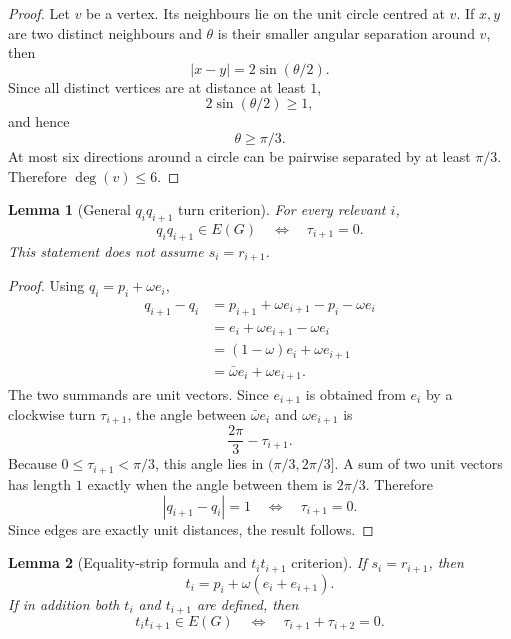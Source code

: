 \documentclass[11pt]{article}
\theoremstyle{plain}
\newtheorem{lemma}{Lemma}
\numberwithin{equation}{section}
\begin{document}
\begin{proof}
Let $v$ be a vertex. Its neighbours lie on the unit circle centred at $v$. If $x,y$ are two distinct neighbours and $\theta$ is their smaller angular separation around $v$, then
\[
 |x-y|=2\sin(\theta/2).
\]
Since all distinct vertices are at distance at least $1$,
\[
 2\sin(\theta/2)\ge1,
\]
and hence
\[
 \theta\ge \pi/3.
\]
At most six directions around a circle can be pairwise separated by at least $\pi/3$. Therefore $\deg(v)\le6$.
\end{proof}

\begin{lemma}[General $q_iq_{i+1}$ turn criterion]\label{lem:q-turn}
For every relevant $i$,
\[
 q_iq_{i+1}\in E(G)
 \quad\Longleftrightarrow\quad
 \tau_{i+1}=0.
\]
This statement does not assume $s_i=r_{i+1}$.
\end{lemma}

\begin{proof}
Using $q_i=p_i+\omega e_i$,
\[
\begin{aligned}
 q_{i+1}-q_i
 &=p_{i+1}+\omega e_{i+1}-p_i-\omega e_i\\
 &=e_i+\omega e_{i+1}-\omega e_i\\
 &=(1-\omega)e_i+\omega e_{i+1}\\
 &=\bar\omega e_i+\omega e_{i+1}.
\end{aligned}
\]
The two summands are unit vectors. Since $e_{i+1}$ is obtained from $e_i$ by a clockwise turn $\tau_{i+1}$, the angle between $\bar\omega e_i$ and $\omega e_{i+1}$ is
\[
 \frac{2\pi}{3}-\tau_{i+1}.
\]
Because $0\le \tau_{i+1}<\pi/3$, this angle lies in $(\pi/3,2\pi/3]$. A sum of two unit vectors has length $1$ exactly when the angle between them is $2\pi/3$. Therefore
\[
 |q_{i+1}-q_i|=1
 \quad\Longleftrightarrow\quad
 \tau_{i+1}=0.
\]
Since edges are exactly unit distances, the result follows.
\end{proof}

\begin{lemma}[Equality-strip formula and $t_it_{i+1}$ criterion]\label{lem:t-equality}
If $s_i=r_{i+1}$, then
\[
 t_i=p_i+\omega(e_i+e_{i+1}).
\]
If in addition both $t_i$ and $t_{i+1}$ are defined, then
\[
 t_it_{i+1}\in E(G)
 \quad\Longleftrightarrow\quad
 \tau_{i+1}+\tau_{i+2}=0.
\]
\end{lemma}
\end{document}
